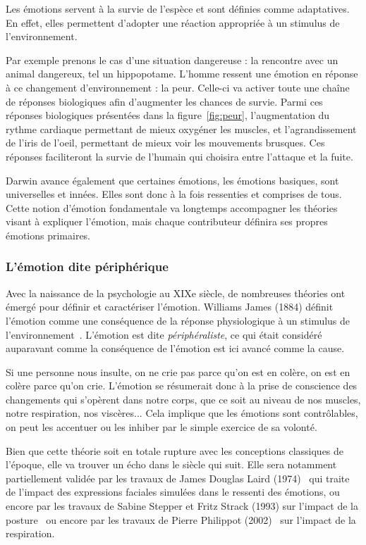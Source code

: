 Les émotions servent à la survie de l’espèce et sont définies comme adaptatives. En effet, elles permettent d'adopter une réaction appropriée à un stimulus de l'environnement.



Par exemple prenons le cas d'une situation dangereuse : la rencontre avec un animal dangereux, tel un hippopotame. L'homme ressent une émotion en réponse à ce changement d'environnement : la peur. Celle-ci va activer toute une chaîne de réponses biologiques afin d'augmenter les chances de survie. Parmi ces réponses biologiques présentées dans la figure~\ref{fig:peur}, l'augmentation du rythme cardiaque permettant de mieux oxygéner les muscles, et l'agrandissement de l'iris de l'oeil, permettant de mieux voir les mouvements brusques. Ces réponses faciliteront la survie de l'humain qui choisira entre l'attaque et la fuite.

Darwin avance également que certaines émotions, les émotions basiques, sont universelles et innées. Elles sont donc à la fois ressenties et comprises de tous. Cette notion d'émotion fondamentale va longtemps accompagner les théories visant à expliquer l'émotion, mais chaque contributeur définira ses propres émotions primaires.

\subsubsection{L'émotion dite périphérique}
Avec la naissance de la psychologie au XIXe siècle, de nombreuses théories ont émergé pour définir et caractériser l'émotion. Williams James (1884) définit l'émotion comme une conséquence de la réponse physiologique à un stimulus de l'environnement~\cite{James1884}. L'émotion est dite \textit{périphéraliste}, ce qui était considéré auparavant comme la conséquence de l’émotion est ici avancé comme la cause.

Si une personne nous insulte, on ne crie pas parce qu'on est en colère, on est en colère parce qu'on crie. L'émotion se résumerait donc à la prise de conscience des changements qui s'opèrent dans notre corps, que ce soit au niveau de nos muscles, notre respiration, nos viscères... Cela implique que les émotions sont contrôlables, on peut les accentuer ou les inhiber par le simple exercice de sa volonté.

Bien que cette théorie soit en totale rupture avec les conceptions classiques de l'époque, elle va trouver un écho dans le siècle qui suit. Elle sera notamment partiellement validée par les travaux de James Douglas Laird (1974)~\cite{Laird1974} qui traite de l'impact des expressions faciales simulées dans le ressenti des émotions, ou encore par les travaux de Sabine Stepper et Fritz Strack (1993) sur l'impact de la posture~\cite{Stepper1993} ou encore par les travaux de Pierre Philippot (2002)~\cite{Philippot2002} sur l'impact de la respiration.

